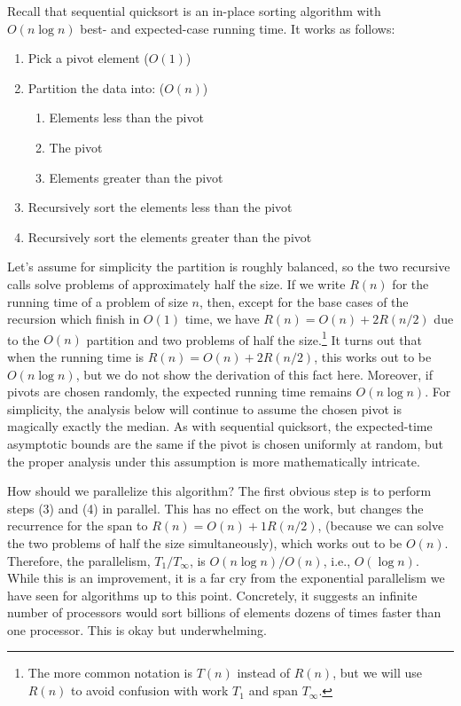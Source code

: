 \documentclass[10pt]{article}
\begin{document}
Recall that sequential quicksort is an in-place sorting algorithm
with $O(n\log n)$ best- and expected-case running time.  It works as
follows:
\begin{enumerate}
\item Pick a pivot element ($O(1)$)
\item Partition the data into: ($O(n)$)
  \begin{enumerate}
  \item Elements less than the pivot
  \item The pivot
  \item Elements greater than the pivot
  \end{enumerate}
\item Recursively sort the elements less than the pivot
\item Recursively sort the elements greater than the pivot
\end{enumerate}
Let's assume for simplicity the partition is roughly balanced, so the
two recursive calls solve problems of approximately half the size.  If
we write $R(n)$ for the running time of a problem of size $n$, then,
except for the base cases of the recursion which finish in $O(1)$
time, we have $R(n) = O(n) + 2R(n/2)$ due to the $O(n)$ partition and
two problems of half the size.\footnote{The more common notation is
  $T(n)$ instead of $R(n)$, but we will use $R(n)$ to avoid confusion
  with work $T_1$ and span $T_\infty$.}  It turns out that when the running
time is $R(n) = O(n) + 2R(n/2)$, this works out to be $O(n\log n)$, but
we do not show the derivation of this fact here.  Moreover, if pivots
are chosen randomly, the expected running time remains
$O(n\log n)$. For simplicity, the analysis below will continue to
assume the chosen pivot is magically exactly the median.  As with
sequential quicksort, the expected-time asymptotic bounds are the same
if the pivot is chosen uniformly at random, but the proper analysis
under this assumption is more mathematically intricate.

How should we parallelize this algorithm?  The first obvious step is
to perform steps (3) and (4) in parallel.  This has no effect on the
work, but changes the recurrence for the span to $R(n)=O(n)+1R(n/2)$,
(because we can solve the two problems of half the size simultaneously),
which works out to be $O(n)$.  Therefore, the parallelism, $T_1/T_\infty$, is
$O(n\log n)/O(n)$, i.e., $O(\log n)$.  While this is an improvement,
it is a far cry from the exponential parallelism we have seen for
algorithms up to this point.  Concretely, it suggests an infinite
number of processors would sort billions of elements dozens of times
faster than one processor.  This is okay but underwhelming.
\end{document}

